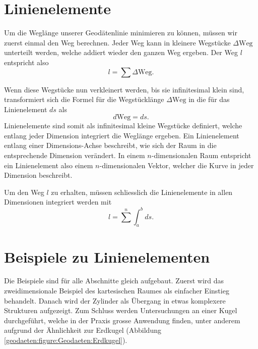 %
%
%
%
\section{Linienelemente\label{geodaeten:section:Linienelemente}}

Um die Weglänge unserer Geodätenlinie minimieren zu können, müssen wir zuerst einmal den Weg berechnen.
%
Jeder Weg kann in kleinere Wegstücke $\Delta \text{Weg}$ unterteilt werden, welche addiert wieder den ganzen Weg ergeben.
Der Weg $l$ entspricht also
\begin{equation}
	l = \sum \Delta \text{Weg} .
\end{equation}

Wenn diese Wegstücke nun verkleinert werden, bis sie infinitesimal klein sind, transformiert sich die Formel für die Wegstücklänge $\Delta \text{Weg}$ in die für das Linienelement $ds$ als
\begin{equation}	
	d\text{Weg} = ds .
	\label{geodaeten:equation:Linienelemente:equation1}
\end{equation}
Linienelemente sind somit als infinitesimal kleine Wegstücke definiert, welche entlang jeder Dimension integriert die Weglänge ergeben.
Ein Linienelement entlang einer Dimensions-Achse beschreibt, wie sich der Raum in die entsprechende Dimension verändert.
In einem $n$-dimensionalen Raum entspricht ein Linienelement also einem $n$-dimensionalen Vektor, welcher die Kurve in jeder Dimension beschreibt.

Um den Weg $l$ zu erhalten, müssen schliesslich die Linienelemente in allen Dimensionen integriert werden mit
\begin{equation}
	l = 
	\sum^{n} \int_a^b ds .
	\label{geodaeten:equation:Linienelemente:equation2}
\end{equation}

\section{Beispiele zu Linienelementen\label{geodaeten:section:Linienelemente:Beispiele}}
Die Beispiele sind für alle Abschnitte gleich aufgebaut.
Zuerst wird das zweidimensionale Beispiel des kartesischen Raumes als einfacher Einstieg behandelt.
%
Danach wird der Zylinder als Übergang in etwas komplexere Strukturen aufgezeigt.
%
Zum Schluss werden Untersuchungen an einer Kugel durchgeführt, welche in der Praxis grosse Anwendung finden, unter anderem aufgrund der Ähnlichkeit zur Erdkugel (Abbildung \ref{geodaeten:figure:Geodaeten:Erdkugel}).





